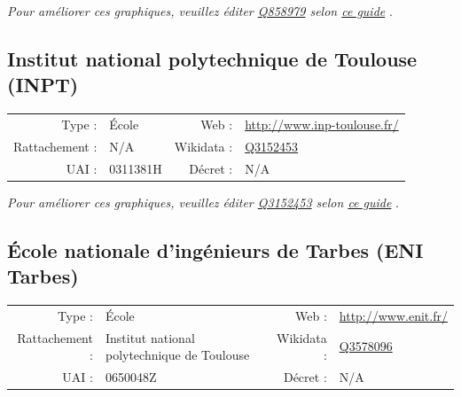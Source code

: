 \documentclass[11pt,french,landscape]{article}
\begin{document}
\textit{\scriptsize Pour améliorer ces graphiques, veuillez éditer \href{https://www.wikidata.org/entity/Q858979}{Q858979}  selon \href{https://github.com/cpesr/wikidataESR/blob/master/Rmd/wikidataESR.md}{ce guide}}
.


\newpage

\hypertarget{institut-national-polytechnique-de-toulouse-inpt}{%
\subsection{Institut national polytechnique de Toulouse
(INPT)}\label{institut-national-polytechnique-de-toulouse-inpt}}

\begin{tabular*}{0.45\textwidth}{rp{2cm}rl}  
\hline  
Type : & École & Web : &\href{http://www.inp-toulouse.fr/}{http://www.inp-toulouse.fr/} \\  
Rattachement : & N/A & Wikidata : & \href{https://www.wikidata.org/entity/Q3152453}{Q3152453} \\  
UAI : & 0311381H & Décret : & N/A \\  
\hline  
\end{tabular*}

\textit{\scriptsize Pour améliorer ces graphiques, veuillez éditer \href{https://www.wikidata.org/entity/Q3152453}{Q3152453}  selon \href{https://github.com/cpesr/wikidataESR/blob/master/Rmd/wikidataESR.md}{ce guide}}
.


\newpage

\hypertarget{uxe9cole-nationale-dinguxe9nieurs-de-tarbes-eni-tarbes}{%
\subsection{École nationale d'ingénieurs de Tarbes (ENI
Tarbes)}\label{uxe9cole-nationale-dinguxe9nieurs-de-tarbes-eni-tarbes}}

\begin{tabular*}{0.45\textwidth}{rp{2cm}rl}  
\hline  
Type : & École & Web : &\href{http://www.enit.fr/}{http://www.enit.fr/} \\  
Rattachement : & Institut national polytechnique de Toulouse & Wikidata : & \href{https://www.wikidata.org/entity/Q3578096}{Q3578096} \\  
UAI : & 0650048Z & Décret : & N/A \\  
\hline  
\end{tabular*}
\end{document}
